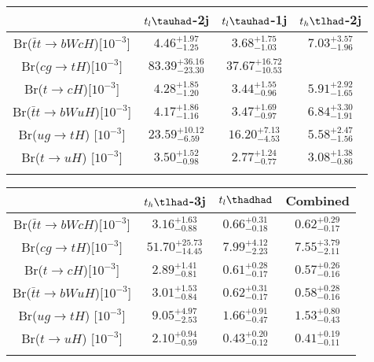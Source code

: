 \centering
\begin{tabular}{cccc} \toprule\toprule
 & $t_l\tauhad$-2j & $t_l\tauhad$-1j & $t_h\tlhad$-2j\\\midrule
Br($\bar{t}t\to bWcH$)[$10^{-3}$]        & $4.46^{+1.97}_{-1.25}$ & $3.68^{+1.75}_{-1.03}$ & $7.03^{+3.57}_{-1.96}$\\
Br($cg\to tH$)[$10^{-3}]$                & $83.39^{+36.16}_{-23.30}$ & $37.67^{+16.72}_{-10.53}$\\
Br($t\to cH$)[$10^{-3}$]                 & $4.28^{+1.85}_{-1.20}$ & $3.44^{+1.55}_{-0.96}$ & $5.91^{+2.92}_{-1.65}$\\
Br($\bar{t}t\to bWuH$)[$10^{-3}$]        & $4.17^{+1.86}_{-1.16}$ & $3.47^{+1.69}_{-0.97}$ & $6.84^{+3.30}_{-1.91}$\\
Br($ug\to tH$) [$10^{-3}$]               & $23.59^{+10.12}_{-6.59}$ & $16.20^{+7.13}_{-4.53}$ & $5.58^{+2.47}_{-1.56}$\\
Br($t\to uH$)  [$10^{-3}$]               & $3.50^{+1.52}_{-0.98}$ & $2.77^{+1.24}_{-0.77}$ & $3.08^{+1.38}_{-0.86}$\\
\bottomrule\bottomrule\\
\end{tabular}
\begin{tabular}{cccc} \toprule\toprule
 & $t_h\tlhad$-3j & $t_l\thadhad$ & Combined\\\midrule
Br($\bar{t}t\to bWcH$)[$10^{-3}$]            & $3.16^{+1.63}_{-0.88}$ & $0.66^{+0.31}_{-0.18}$ & $0.62^{+0.29}_{-0.17}$\\
Br($cg\to tH$)[$10^{-3}]$                    & $51.70^{+25.73}_{-14.45}$ & $7.99^{+4.12}_{-2.23}$ & $7.55^{+3.79}_{-2.11}$\\
Br($t\to cH$)[$10^{-3}$]                     & $2.89^{+1.41}_{-0.81}$ & $0.61^{+0.28}_{-0.17}$ & $0.57^{+0.26}_{-0.16}$\\
Br($\bar{t}t\to bWuH$)[$10^{-3}$]            & $3.01^{+1.53}_{-0.84}$ & $0.62^{+0.31}_{-0.17}$ & $0.58^{+0.28}_{-0.16}$\\
Br($ug\to tH$) [$10^{-3}$]                   & $9.05^{+4.97}_{-2.53}$ & $1.66^{+0.91}_{-0.47}$ & $1.53^{+0.80}_{-0.43}$\\
Br($t\to uH$)  [$10^{-3}$]                   & $2.10^{+0.94}_{-0.59}$ & $0.43^{+0.20}_{-0.12}$ & $0.41^{+0.19}_{-0.11}$\\
\bottomrule\bottomrule\\
\end{tabular}


